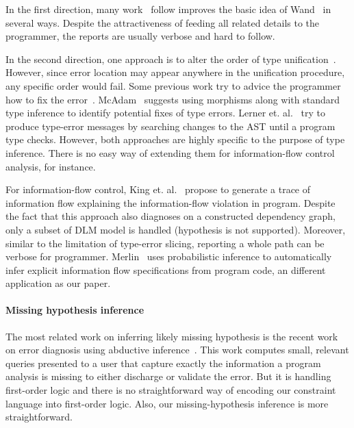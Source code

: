 In the first direction, many work~\cite{choppella95, haack:slicing,
tip:slicing} follow improves the basic idea of Wand~\cite{wand-errorfinding} in
several ways. Despite the attractiveness of feeding all related details to the
programmer, the reports are usually verbose and hard to follow.

In the second direction, one approach is to alter the order of type
unification~\cite{lee:toplas, mcadam:unification}. However, since error
location may appear anywhere in the unification procedure, any specific order
would fail. Some previous work try to advice the programmer how to fix the
error~\cite{mcadam:thesis, lerner:pldi07}. McAdam~\cite{mcadam:thesis} suggests
using morphisms along with standard type inference to identify potential fixes
of type errors. Lerner et. al.~\cite{lerner:pldi07} try to produce type-error
messages by searching changes to the AST until a program type checks. However,
both approaches are highly specific to the purpose of type inference. There is
no easy way of extending them for information-flow control analysis, for
instance.

For information-flow control, King et. al.~\cite{king:fse} propose to
generate a trace of information flow explaining the information-flow violation
in program. Despite the fact that this approach also diagnoses on a constructed
dependency graph, only a subset of DLM model is handled (hypothesis is not
supported). Moreover, similar to the limitation of type-error slicing,
reporting a whole path can be verbose for programmer.
Merlin~\cite{livshits:merlin} uses probabilistic inference to automatically
infer explicit information flow specifications from program code, an different
application as our paper.

\paragraph{Missing hypothesis inference}

The most related work on inferring likely missing hypothesis is the recent work
on error diagnosis using abductive inference~\cite{dillig:pldi12}. This work
computes small, relevant queries presented to a user that capture exactly the
information a program analysis is missing to either discharge or validate the
error. But it is handling first-order logic and there is no straightforward way
of encoding our constraint language into first-order logic. Also, our
missing-hypothesis inference is more straightforward.






